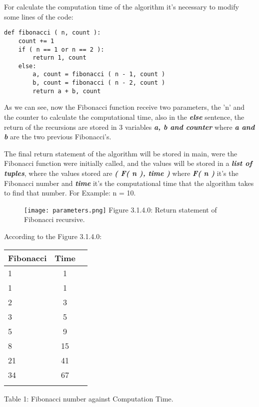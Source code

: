 \documentclass[10pt,a4paper]{article}
\begin{document}
For calculate the computation time of the algorithm it's necessary to modify some lines of the code: \hfill \break

\begin{lstlisting}
def fibonacci ( n, count ):
    count += 1
    if ( n == 1 or n == 2 ):
        return 1, count
    else:
        a, count = fibonacci ( n - 1, count )
        b, count = fibonacci ( n - 2, count )
        return a + b, count
\end{lstlisting} \hfill

As we can see, now the Fibonacci function receive two parameters, the 'n' and the counter to calculate the computational time, also in the {\bfseries\itshape else} sentence, the return of the recursions are stored in 3 variables {\bfseries\itshape a, b and counter} where {\bfseries\itshape a and b} are the two previous Fibonacci's. \hfill \break

The final return statement of the algorithm will be stored in main, were the Fibonacci function were initially called, and the values will be stored in a {\bfseries\itshape list of tuples}, where the values stored are {\bfseries\itshape ( F( n ), time )} where {\bfseries\itshape F( n )} it's the Fibonacci number and {\bfseries\itshape time} it's the computational time that the algorithm takes to find that number. For Example: n = 10.

\begin{figure}[H]
\texttt{[image: parameters.png]}
\centering \linebreak \linebreak Figure 3.1.4.0: Return statement of Fibonacci recursive.
\end{figure}

According to the Figure 3.1.4.0:

\begin{center}
\begin{itemize}
\end{itemize}
\begin{tabular}[.5cm]{l c c }
\toprule
Fibonacci & Time \\
\midrule
1 & 1 \\
\cmidrule{1-2}
1 & 1 \\
\cmidrule{1-2}
2 & 3 \\
\cmidrule{1-2}
3 & 5 \\
\cmidrule{1-2}
5 & 9 \\
\cmidrule{1-2}
8 & 15 \\
\cmidrule{1-2}
21 & 41 \\
\cmidrule{1-2}
34 & 67 \\
\bottomrule
\linebreak
\end{tabular}
\linebreak Table 1: Fibonacci number against Computation Time.
\end{center}
\end{document}
